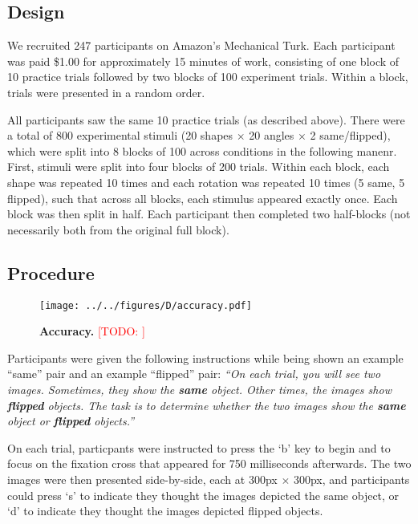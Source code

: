 \documentclass[10pt,letterpaper]{article}
\newcommand{\TODO}[1]{\textcolor{red}{[TODO: #1]}}
\begin{document}
\subsection{Design}

We recruited 247 participants on Amazon's Mechanical Turk. Each
participant was paid \$1.00 for approximately 15 minutes of work,
consisting of one block of 10 practice trials followed by two blocks
of 100 experiment trials. Within a block, trials were presented in a
random order.

All participants saw the same 10 practice trials (as described
above). There were a total of 800 experimental stimuli (20 shapes
$\times$ 20 angles $\times$ 2 same/flipped), which were split into 8
blocks of 100 across conditions in the following manenr. First,
stimuli were split into four blocks of 200 trials. Within each block,
each shape was repeated 10 times and each rotation was repeated 10
times (5 same, 5 flipped), such that across all blocks, each stimulus
appeared exactly once. Each block was then split in half. Each
participant then completed two half-blocks (not necessarily both from
the original full block).

\subsection{Procedure}

\begin{figure*}[t]
  \begin{center}
    \texttt{[image: ../../figures/D/accuracy.pdf]}
    \caption{\textbf{Accuracy.} \TODO{}}
    \label{fig:accuracy}
  \end{center}
\end{figure*}

Participants were given the following instructions while being shown
an example ``same'' pair and an example ``flipped'' pair: \textit{``On
  each trial, you will see two images. Sometimes, they show the
  \textbf{same} object. Other times, the images show \textbf{flipped}
  objects. The task is to determine whether the two images show the
  \textbf{same} object or \textbf{flipped} objects.''}

On each trial, particpants were instructed to press the `b' key to
begin and to focus on the fixation cross that appeared for 750
milliseconds afterwards. The two images were then presented
side-by-side, each at 300px $\times$ 300px, and participants could
press `s' to indicate they thought the images depicted the same
object, or `d' to indicate they thought the images depicted flipped
objects.
\end{document}
